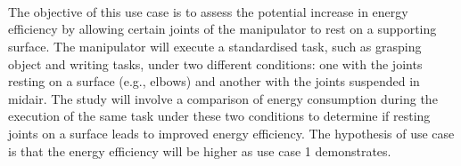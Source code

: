 \documentclass[report.tex]{subfiles}
\begin{document}
    \paragraph{\\}
    The objective of this use case is to assess the potential increase in energy efficiency by allowing certain joints of the manipulator to rest on a supporting surface. The manipulator will execute a standardised task, such as grasping object and writing tasks, under two different conditions: one with the joints resting on a surface (e.g., elbows) and another with the joints suspended in midair. The study will involve a comparison of energy consumption during the execution of the same task under these two conditions to determine if resting joints on a surface leads to improved energy efficiency. The hypothesis of use case is that the energy efficiency will be higher as use case 1 demonstrates.
\end{document}
